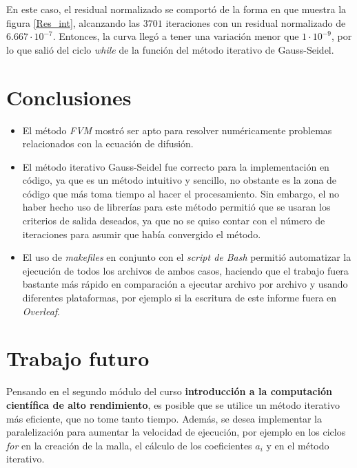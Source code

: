 \documentclass[article,latterpaper]{IEEEtran}
\begin{document}
En este caso, el residual normalizado se comportó de la forma en que muestra la figura \ref{Res_int}, alcanzando las $3701$ iteraciones con un residual normalizado de $6.667\cdot 10^{-7}$. Entonces, la curva llegó a tener una variación menor que $1\cdot 10^{-9}$, por lo que salió del ciclo \textit{while} de la función del método iterativo de Gauss-Seidel.

\section{Conclusiones}

\begin{itemize}
	\item El método \textit{FVM} mostró ser apto para resolver numéricamente problemas relacionados con la ecuación de difusión.
	\item El método iterativo Gauss-Seidel fue correcto para la implementación en código, ya que es un método intuitivo y sencillo, no obstante es la zona de código que más toma tiempo al hacer el procesamiento. Sin embargo, el no haber hecho uso de librerías para este método permitió que se usaran los criterios de salida deseados, ya que no se quiso contar con el número de iteraciones para asumir que había convergido el método.
	\item El uso de \textit{makefiles} en conjunto con el \textit{script de Bash} permitió automatizar la ejecución de todos los archivos de ambos casos, haciendo que el trabajo fuera bastante más rápido en comparación a ejecutar archivo por archivo y usando diferentes plataformas, por ejemplo si la escritura de este informe fuera en \textit{Overleaf}.
\end{itemize}

\section{Trabajo futuro}
Pensando en el segundo módulo del curso \textbf{introducción a la computación científica de alto rendimiento}, es posible que se utilice un método iterativo más eficiente, que no tome tanto tiempo. Además, se desea implementar la paralelización para aumentar la velocidad de ejecución, por ejemplo en los ciclos \textit{for} en la creación de la malla, el cálculo de los coeficientes $a_i$ y en el método iterativo.
\end{document}
